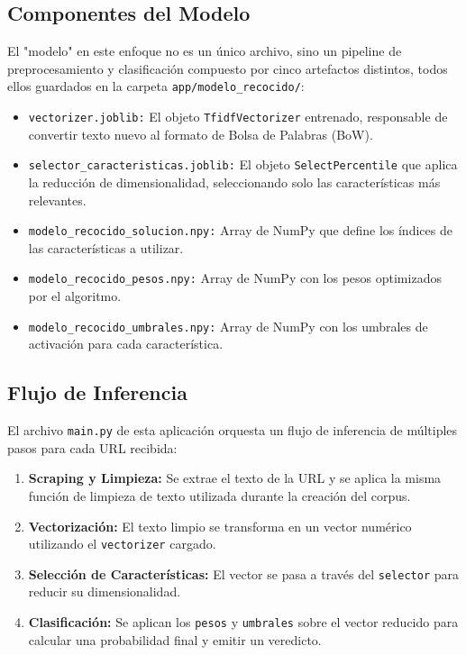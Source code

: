 \subsection{Componentes del Modelo}
El "modelo" en este enfoque no es un único archivo, sino un pipeline de preprocesamiento y clasificación compuesto por cinco artefactos distintos, todos ellos guardados en la carpeta \texttt{app/modelo\_recocido/}:
\begin{itemize}
    \item \texttt{vectorizer.joblib:} El objeto \texttt{TfidfVectorizer} entrenado, responsable de convertir texto nuevo al formato de Bolsa de Palabras (BoW).
    \item \texttt{selector\_caracteristicas.joblib:} El objeto \texttt{SelectPercentile} que aplica la reducción de dimensionalidad, seleccionando solo las características más relevantes.
    \item \texttt{modelo\_recocido\_solucion.npy:} Array de NumPy que define los índices de las características a utilizar.
    \item \texttt{modelo\_recocido\_pesos.npy:} Array de NumPy con los pesos optimizados por el algoritmo.
    \item \texttt{modelo\_recocido\_umbrales.npy:} Array de NumPy con los umbrales de activación para cada característica.
\end{itemize}

\subsection{Flujo de Inferencia}
El archivo \texttt{main.py} de esta aplicación orquesta un flujo de inferencia de múltiples pasos para cada URL recibida:
\begin{enumerate}
    \item \textbf{Scraping y Limpieza:} Se extrae el texto de la URL y se aplica la misma función de limpieza de texto utilizada durante la creación del corpus.
    \item \textbf{Vectorización:} El texto limpio se transforma en un vector numérico utilizando el \texttt{vectorizer} cargado.
    \item \textbf{Selección de Características:} El vector se pasa a través del \texttt{selector} para reducir su dimensionalidad.
    \item \textbf{Clasificación:} Se aplican los \texttt{pesos} y \texttt{umbrales} sobre el vector reducido para calcular una probabilidad final y emitir un veredicto.
\end{enumerate}

